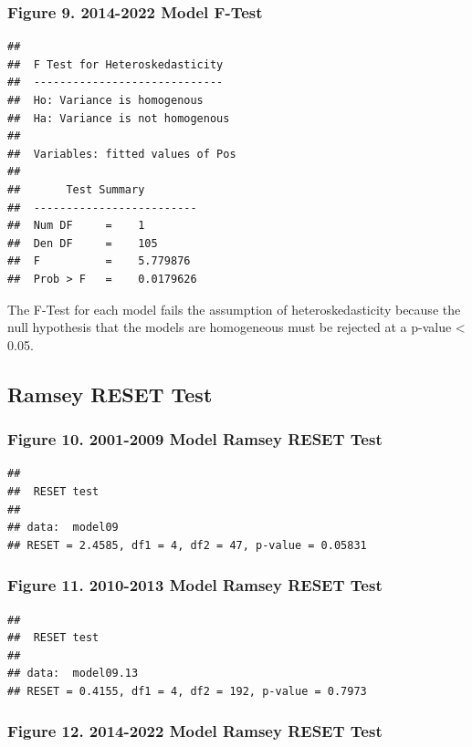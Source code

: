 \documentclass[
  12pt,
]{article}
\begin{document}
\subsubsection{Figure 9. 2014-2022 Model
F-Test}\label{figure-9.-2014-2022-model-f-test}

\begin{verbatim}
## 
##  F Test for Heteroskedasticity
##  -----------------------------
##  Ho: Variance is homogenous
##  Ha: Variance is not homogenous
## 
##  Variables: fitted values of Pos 
## 
##       Test Summary        
##  -------------------------
##  Num DF     =    1 
##  Den DF     =    105 
##  F          =    5.779876 
##  Prob > F   =    0.0179626
\end{verbatim}

The F-Test for each model fails the assumption of heteroskedasticity
because the null hypothesis that the models are homogeneous must be
rejected at a p-value \textless{} 0.05.

\subsection{Ramsey RESET Test}\label{ramsey-reset-test}

\subsubsection{Figure 10. 2001-2009 Model Ramsey RESET
Test}\label{figure-10.-2001-2009-model-ramsey-reset-test}

\begin{verbatim}
## 
##  RESET test
## 
## data:  model09
## RESET = 2.4585, df1 = 4, df2 = 47, p-value = 0.05831
\end{verbatim}

\subsubsection{Figure 11. 2010-2013 Model Ramsey RESET
Test}\label{figure-11.-2010-2013-model-ramsey-reset-test}

\begin{verbatim}
## 
##  RESET test
## 
## data:  model09.13
## RESET = 0.4155, df1 = 4, df2 = 192, p-value = 0.7973
\end{verbatim}

\subsubsection{Figure 12. 2014-2022 Model Ramsey RESET
Test}\label{figure-12.-2014-2022-model-ramsey-reset-test}
\end{document}
